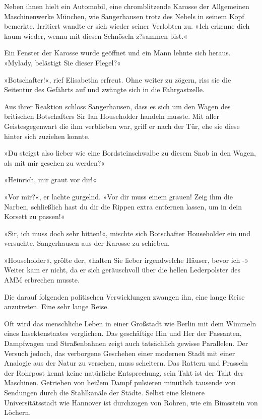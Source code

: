 Neben ihnen hielt ein Automobil, eine chromblitzende Karosse der
Allgemeinen Maschinenwerke München, wie Sangerhausen trotz des
Nebels in seinem Kopf bemerkte. Irritiert wandte er sich wieder
seiner Verlobten zu. »Ich erkenne dich kaum wieder, wennu mit
diesen Schnöseln z?sammen bist.«

Ein Fenster der Karosse wurde geöffnet und ein Mann lehnte sich
heraus. »Mylady, belästigt Sie dieser Flegel?«

»Botschafter!«, rief Elisabetha erfreut. Ohne weiter zu zögern,
riss sie die Seitentür des Gefährts auf und zwängte sich in die
Fahrgastzelle.

Aus ihrer Reaktion schloss Sangerhausen, dass es sich um den Wagen
des britischen Botschafters Sir Ian Householder handeln musste. Mit
aller Geistesgegenwart die ihm verblieben war, griff er nach der
Tür, ehe sie diese hinter sich zuziehen konnte.

»Du steigst also lieber wie eine Bordsteinschwalbe zu diesem Snob
in den Wagen, als mit mir gesehen zu werden?«

»Heinrich, mir graut vor dir!«

»Vor mir?«, er lachte gurgelnd. »Vor dir muss einem grauen! Zeig
ihm die Narben, schließlich hast du dir die Rippen extra entfernen
lassen, um in dein Korsett zu passen!«

»Sir, ich muss doch sehr bitten!«, mischte sich Botschafter
Householder ein und versuchte, Sangerhausen aus der Karosse zu
schieben.

»Householder«, grölte der, »halten Sie lieber irgendwelche Häuser,
bevor ich -» Weiter kam er nicht, da er sich geräuschvoll über die
hellen Lederpolster des AMM erbrechen musste.

Die darauf folgenden politischen Verwicklungen zwangen ihn, eine
lange Reise anzutreten. Eine sehr lange Reise.

\tb

Oft wird das menschliche Leben in einer Großstadt wie Berlin mit
dem Wimmeln eines Insektenstaates verglichen. Das geschäftige Hin
und Her der Passanten, Dampfwagen und Straßenbahnen zeigt auch
tatsächlich gewisse Parallelen. Der Versuch jedoch, das verborgene
Geschehen einer modernen Stadt mit einer Analogie aus der Natur zu
versehen, muss scheitern. Das Rattern und Prasseln der Rohrpost
kennt keine natürliche Entsprechung, sein Takt ist der Takt der
Maschinen. Getrieben von heißem Dampf pulsieren minütlich tausende
von Sendungen durch die Stahlkanäle der Städte. Selbst eine
kleinere Universitätsstadt wie Hannover ist durchzogen von Rohren,
wie ein Bimsstein von Löchern.


